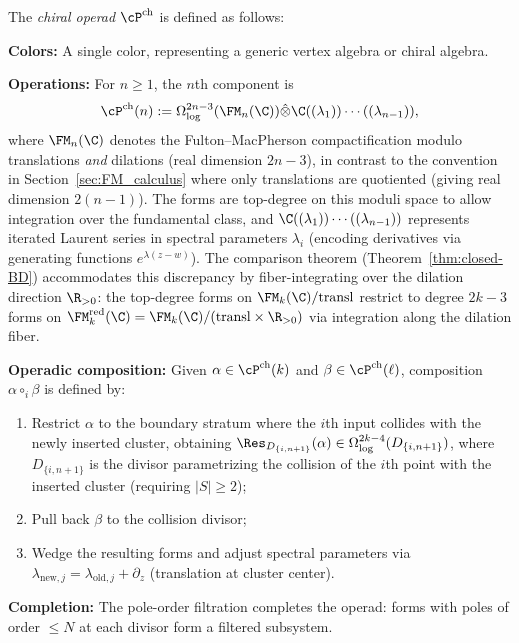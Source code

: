 \begin{construction}
\label{def:chiral_operad}
The \emph{chiral operad} $\cP^{\mathrm{ch}}$ is defined as follows:

\textbf{Colors:} A single color, representing a generic vertex algebra or chiral algebra.

\textbf{Operations:} For $n \geq 1$, the $n$th component is
\[
\cP^{\mathrm{ch}}(n) := \Omega^{2n-3}_{\log}(\FM_n(\C)) \hat{\otimes} \C((\lambda_1)) \cdots ((\lambda_{n-1})),
\]
where $\FM_n(\C)$ denotes the Fulton--MacPherson compactification modulo translations \emph{and} dilations (real dimension $2n-3$), in contrast to the convention in Section~\ref{sec:FM_calculus} where only translations are quotiented (giving real dimension $2(n-1)$). The forms are top-degree on this moduli space to allow integration over the fundamental class, and $\C((\lambda_1)) \cdots ((\lambda_{n-1}))$ represents iterated Laurent series in spectral parameters $\lambda_i$ (encoding derivatives via generating functions $e^{\lambda(z-w)}$). The comparison theorem (Theorem~\ref{thm:closed-BD}) accommodates this discrepancy by fiber-integrating over the dilation direction $\R_{>0}$: the top-degree forms on $\FM_k(\C)/\text{transl}$ restrict to degree $2k-3$ forms on $\FM_k^{\mathrm{red}}(\C) = \FM_k(\C)/(\text{transl} \times \R_{>0})$ via integration along the dilation fiber.

\textbf{Operadic composition:} Given $\alpha \in \cP^{\mathrm{ch}}(k)$ and $\beta \in \cP^{\mathrm{ch}}(\ell)$, composition $\alpha \circ_i \beta$ is defined by:
\begin{enumerate}[label=(\roman*)]
\item Restrict $\alpha$ to the boundary stratum where the $i$th input collides with the newly inserted cluster, obtaining $\Res_{D_{\{i, n+1\}}}(\alpha) \in \Omega^{2k-4}_{\log}(D_{\{i, n+1\}})$, where $D_{\{i, n+1\}}$ is the divisor parametrizing the collision of the $i$th point with the inserted cluster (requiring $|S| \geq 2$);
\item Pull back $\beta$ to the collision divisor;
\item Wedge the resulting forms and adjust spectral parameters via $\lambda_{\text{new},j} = \lambda_{\text{old},j} + \partial_z$ (translation at cluster center).
\end{enumerate}

\textbf{Completion:} The pole-order filtration completes the operad: forms with poles of order $\leq N$ at each divisor form a filtered subsystem.
\end{construction}

